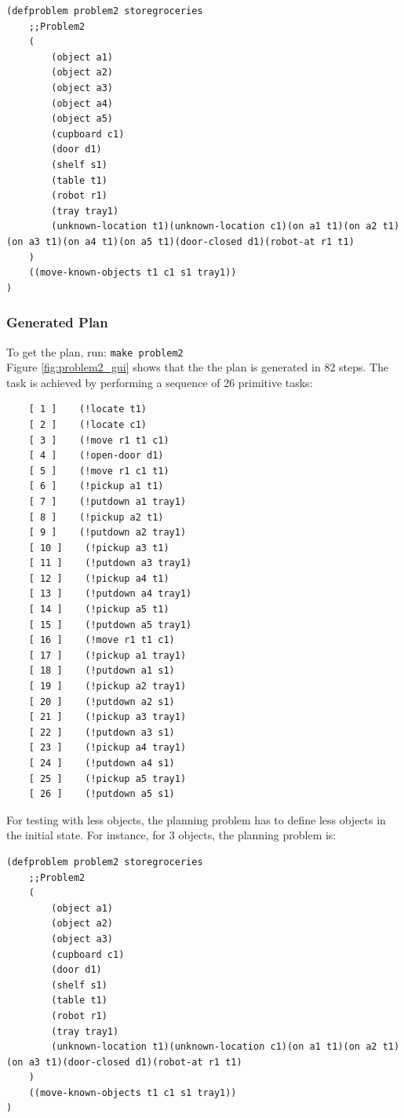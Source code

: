 \documentclass[paper=a4, fontsize=11pt]{scrartcl}
\begin{document}
	\begin{lstlisting}
(defproblem problem2 storegroceries
	;;Problem2
	(
		(object a1)
		(object a2)
		(object a3)
		(object a4)
		(object a5)
		(cupboard c1)
		(door d1)
		(shelf s1)
		(table t1)
		(robot r1)
		(tray tray1)
		(unknown-location t1)(unknown-location c1)(on a1 t1)(on a2 t1)(on a3 t1)(on a4 t1)(on a5 t1)(door-closed d1)(robot-at r1 t1)
	)
	((move-known-objects t1 c1 s1 tray1))
)
	\end{lstlisting}
	
	\subsubsection*{Generated Plan}
	
	To get the plan, run: \verb|make problem2| \\
	
	Figure \ref{fig:problem2_gui} shows that the the plan is generated in 82 steps. The task is achieved by performing a sequence of 26 primitive tasks: \\
	
	\begin{lstlisting}
	[ 1 ]    (!locate t1)
	[ 2 ]    (!locate c1)
	[ 3 ]    (!move r1 t1 c1)
	[ 4 ]    (!open-door d1)
	[ 5 ]    (!move r1 c1 t1)
	[ 6 ]    (!pickup a1 t1)
	[ 7 ]    (!putdown a1 tray1)
	[ 8 ]    (!pickup a2 t1)
	[ 9 ]    (!putdown a2 tray1)
	[ 10 ]    (!pickup a3 t1)
	[ 11 ]    (!putdown a3 tray1)
	[ 12 ]    (!pickup a4 t1)
	[ 13 ]    (!putdown a4 tray1)
	[ 14 ]    (!pickup a5 t1)
	[ 15 ]    (!putdown a5 tray1)
	[ 16 ]    (!move r1 t1 c1)
	[ 17 ]    (!pickup a1 tray1)
	[ 18 ]    (!putdown a1 s1)
	[ 19 ]    (!pickup a2 tray1)
	[ 20 ]    (!putdown a2 s1)
	[ 21 ]    (!pickup a3 tray1)
	[ 22 ]    (!putdown a3 s1)
	[ 23 ]    (!pickup a4 tray1)
	[ 24 ]    (!putdown a4 s1)
	[ 25 ]    (!pickup a5 tray1)
	[ 26 ]    (!putdown a5 s1)
	\end{lstlisting} 
	
	\newpage
	
	For testing with less objects, the planning problem has to define less objects in the initial state. For instance, for 3 objects, the planning problem is: \\
	
	\begin{lstlisting}
(defproblem problem2 storegroceries
	;;Problem2
	(
		(object a1)
		(object a2)
		(object a3)
		(cupboard c1)
		(door d1)
		(shelf s1)
		(table t1)
		(robot r1)
		(tray tray1)
		(unknown-location t1)(unknown-location c1)(on a1 t1)(on a2 t1)(on a3 t1)(door-closed d1)(robot-at r1 t1)
	)
	((move-known-objects t1 c1 s1 tray1))
)
	\end{lstlisting}
	
\end{document}
